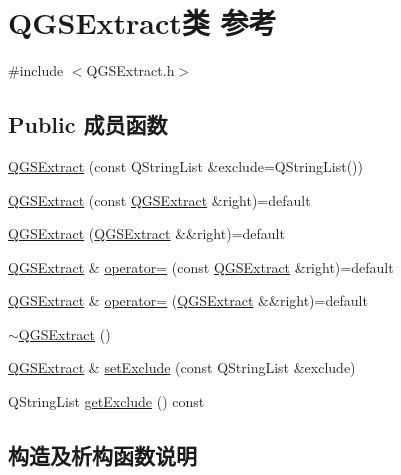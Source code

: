 \hypertarget{class_q_g_s_extract}{}\section{Q\+G\+S\+Extract类 参考}
\label{class_q_g_s_extract}


{\ttfamily \#include $<$Q\+G\+S\+Extract.\+h$>$}

\subsection*{Public 成员函数}
\begin{DoxyCompactItemize}
\item 
\mbox{\hyperlink{class_q_g_s_extract_afccf7959397eb8e1a25f1183298ae86f}{Q\+G\+S\+Extract}} (const Q\+String\+List \&exclude=Q\+String\+List())
\item 
\mbox{\hyperlink{class_q_g_s_extract_a6a520f003384e2e0aed4b73e73e7c5b9}{Q\+G\+S\+Extract}} (const \mbox{\hyperlink{class_q_g_s_extract}{Q\+G\+S\+Extract}} \&right)=default
\item 
\mbox{\hyperlink{class_q_g_s_extract_a80faeecb52e0d751ff8417849e208fc5}{Q\+G\+S\+Extract}} (\mbox{\hyperlink{class_q_g_s_extract}{Q\+G\+S\+Extract}} \&\&right)=default
\item 
\mbox{\hyperlink{class_q_g_s_extract}{Q\+G\+S\+Extract}} \& \mbox{\hyperlink{class_q_g_s_extract_aec0e077a12335be4630f79dae70a3d04}{operator=}} (const \mbox{\hyperlink{class_q_g_s_extract}{Q\+G\+S\+Extract}} \&right)=default
\item 
\mbox{\hyperlink{class_q_g_s_extract}{Q\+G\+S\+Extract}} \& \mbox{\hyperlink{class_q_g_s_extract_a8c59b0c27634fecb2da35a69ec924986}{operator=}} (\mbox{\hyperlink{class_q_g_s_extract}{Q\+G\+S\+Extract}} \&\&right)=default
\item 
\mbox{\hyperlink{class_q_g_s_extract_a1e5d38d869c5254357d195672a49d96b}{$\sim$\+Q\+G\+S\+Extract}} ()
\item 
\mbox{\hyperlink{class_q_g_s_extract}{Q\+G\+S\+Extract}} \& \mbox{\hyperlink{class_q_g_s_extract_a86ab3efd2c110b2951f455cee4d6edb1}{set\+Exclude}} (const Q\+String\+List \&exclude)
\item 
Q\+String\+List \mbox{\hyperlink{class_q_g_s_extract_a7521d8e909d10fb18385ded0ad5ecd04}{get\+Exclude}} () const
\end{DoxyCompactItemize}


\subsection{构造及析构函数说明}
\mbox{\label{class_q_g_s_extract_afccf7959397eb8e1a25f1183298ae86f}} 
